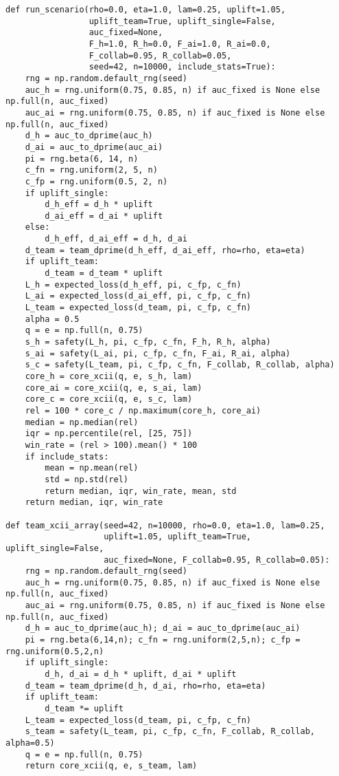 \documentclass[11pt,a4paper]{article}
\begin{document}
\begin{lstlisting}
def run_scenario(rho=0.0, eta=1.0, lam=0.25, uplift=1.05,
                 uplift_team=True, uplift_single=False,
                 auc_fixed=None,
                 F_h=1.0, R_h=0.0, F_ai=1.0, R_ai=0.0,
                 F_collab=0.95, R_collab=0.05,
                 seed=42, n=10000, include_stats=True):
    rng = np.random.default_rng(seed)
    auc_h = rng.uniform(0.75, 0.85, n) if auc_fixed is None else np.full(n, auc_fixed)
    auc_ai = rng.uniform(0.75, 0.85, n) if auc_fixed is None else np.full(n, auc_fixed)
    d_h = auc_to_dprime(auc_h)
    d_ai = auc_to_dprime(auc_ai)
    pi = rng.beta(6, 14, n)
    c_fn = rng.uniform(2, 5, n)
    c_fp = rng.uniform(0.5, 2, n)
    if uplift_single:
        d_h_eff = d_h * uplift
        d_ai_eff = d_ai * uplift
    else:
        d_h_eff, d_ai_eff = d_h, d_ai
    d_team = team_dprime(d_h_eff, d_ai_eff, rho=rho, eta=eta)
    if uplift_team:
        d_team = d_team * uplift
    L_h = expected_loss(d_h_eff, pi, c_fp, c_fn)
    L_ai = expected_loss(d_ai_eff, pi, c_fp, c_fn)
    L_team = expected_loss(d_team, pi, c_fp, c_fn)
    alpha = 0.5
    q = e = np.full(n, 0.75)
    s_h = safety(L_h, pi, c_fp, c_fn, F_h, R_h, alpha)
    s_ai = safety(L_ai, pi, c_fp, c_fn, F_ai, R_ai, alpha)
    s_c = safety(L_team, pi, c_fp, c_fn, F_collab, R_collab, alpha)
    core_h = core_xcii(q, e, s_h, lam)
    core_ai = core_xcii(q, e, s_ai, lam)
    core_c = core_xcii(q, e, s_c, lam)
    rel = 100 * core_c / np.maximum(core_h, core_ai)
    median = np.median(rel)
    iqr = np.percentile(rel, [25, 75])
    win_rate = (rel > 100).mean() * 100
    if include_stats:
        mean = np.mean(rel)
        std = np.std(rel)
        return median, iqr, win_rate, mean, std
    return median, iqr, win_rate

def team_xcii_array(seed=42, n=10000, rho=0.0, eta=1.0, lam=0.25,
                    uplift=1.05, uplift_team=True, uplift_single=False,
                    auc_fixed=None, F_collab=0.95, R_collab=0.05):
    rng = np.random.default_rng(seed)
    auc_h = rng.uniform(0.75, 0.85, n) if auc_fixed is None else np.full(n, auc_fixed)
    auc_ai = rng.uniform(0.75, 0.85, n) if auc_fixed is None else np.full(n, auc_fixed)
    d_h = auc_to_dprime(auc_h); d_ai = auc_to_dprime(auc_ai)
    pi = rng.beta(6,14,n); c_fn = rng.uniform(2,5,n); c_fp = rng.uniform(0.5,2,n)
    if uplift_single:
        d_h, d_ai = d_h * uplift, d_ai * uplift
    d_team = team_dprime(d_h, d_ai, rho=rho, eta=eta)
    if uplift_team:
        d_team *= uplift
    L_team = expected_loss(d_team, pi, c_fp, c_fn)
    s_team = safety(L_team, pi, c_fp, c_fn, F_collab, R_collab, alpha=0.5)
    q = e = np.full(n, 0.75)
    return core_xcii(q, e, s_team, lam)


\end{lstlisting}
\end{document}
